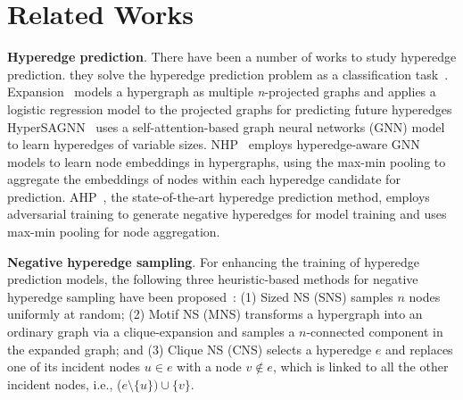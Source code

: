 \section{Related Works}
\label{sec-related}
\textbf{Hyperedge prediction}.
There have been a number of works to study hyperedge prediction.
they solve the hyperedge prediction problem as a classification task~\cite{yoon2020expansion,zhang2019hyperSAGNN,yadati2020nhp,hwang2022ahp}.
Expansion~\cite{yoon2020expansion} models a hypergraph as multiple \textit{n}-projected graphs and applies a logistic regression model to the projected graphs for predicting future hyperedges 
HyperSAGNN~\cite{zhang2019hyperSAGNN} uses a self-attention-based graph neural networks (GNN) model to learn hyperedges of variable sizes. 
NHP~\cite{yadati2020nhp} employs hyperedge-aware GNN models to learn node embeddings in hypergraphs, using the max-min pooling to aggregate the embeddings of nodes within each hyperedge candidate for prediction. 
AHP~\cite{hwang2022ahp}, the state-of-the-art hyperedge prediction method, employs adversarial training to generate negative hyperedges for model training and uses max-min pooling for node aggregation. 


\vspace{1mm}
\noindent
\textbf{Negative hyperedge sampling}.
For enhancing the training of hyperedge prediction models, 
the following three heuristic-based methods for negative hyperedge sampling have been proposed~\cite{patil2020heuristic}:
(1) Sized NS (SNS) samples $n$ nodes uniformly at random;
(2) Motif NS (MNS) transforms a hypergraph into an ordinary graph via a clique-expansion and samples a $n$-connected component in the expanded graph;
and (3) Clique NS (CNS) selects a hyperedge $e$ and replaces one of its incident nodes $u\in e$ with a node $v\notin e$, which is linked to all the other incident nodes, i.e., ($e \setminus \{u\}) \cup \{v\}$.






